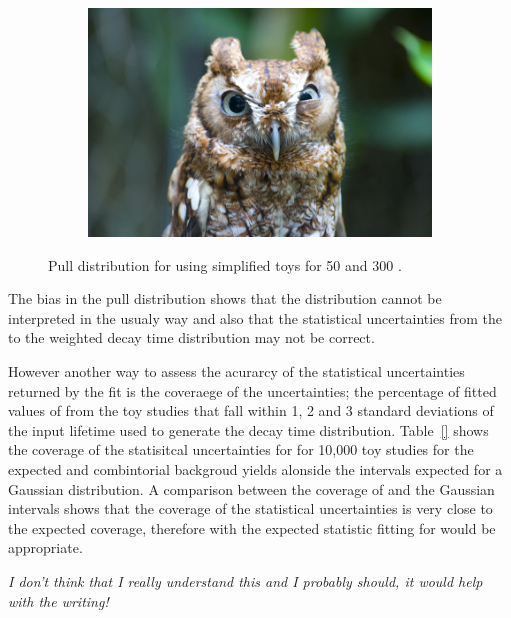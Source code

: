 {\begin{figure}[htbp]
\begin{subfigure}[b]{0.48\textwidth}
       \includegraphics[width=\textwidth]{./Figs/placeholder.jpeg}
   \end{subfigure}
    \caption{Pull distribution for \tmumu using simplified toys for 50 and 300 \fb.}
    \label{fig:morestatstaupulls}
\end{figure}


The bias in the \tmumu pull distribution shows that the distribution cannot be interpreted in the usualy way and also that the statistical uncertainties from the \ml to the weighted decay time distribution may not be correct. 

However another way to assess the acurarcy of the statistical uncertainties returned by the \ml fit is the coveraege of the uncertainties; the percentage of fitted values of \tmumu from the toy studies that fall within 1, 2 and 3 standard deviations of the input lifetime used to generate the \bsmumu decay time distribution. Table~\ref{} shows the coverage of the statisitcal uncertainties for \tmumu for 10,000 toy studies for the expected \bsmumu and combintorial backgroud yields alonside the intervals expected for a Gaussian distribution. A comparison between the coverage of \tmumu and the Gaussian intervals shows that the coverage of the statistical uncertainties is very close to the expected coverage, therefore with the expected statistic fitting for \tmumu would be appropriate.

{\it I don't think that I really understand this and I probably should, it would help with the writing!}


}
